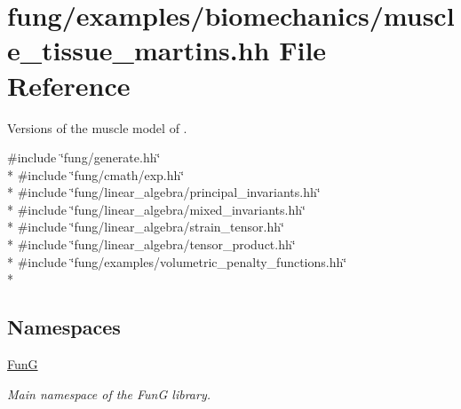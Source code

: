 \hypertarget{muscle__tissue__martins_8hh}{}\section{fung/examples/biomechanics/muscle\+\_\+tissue\+\_\+martins.hh File Reference}
\label{muscle__tissue__martins_8hh}


Versions of the muscle model of \cite{Martins1998}.  


{\ttfamily \#include \char`\"{}fung/generate.\+hh\char`\"{}}\\*
{\ttfamily \#include \char`\"{}fung/cmath/exp.\+hh\char`\"{}}\\*
{\ttfamily \#include \char`\"{}fung/linear\+\_\+algebra/principal\+\_\+invariants.\+hh\char`\"{}}\\*
{\ttfamily \#include \char`\"{}fung/linear\+\_\+algebra/mixed\+\_\+invariants.\+hh\char`\"{}}\\*
{\ttfamily \#include \char`\"{}fung/linear\+\_\+algebra/strain\+\_\+tensor.\+hh\char`\"{}}\\*
{\ttfamily \#include \char`\"{}fung/linear\+\_\+algebra/tensor\+\_\+product.\+hh\char`\"{}}\\*
{\ttfamily \#include \char`\"{}fung/examples/volumetric\+\_\+penalty\+\_\+functions.\+hh\char`\"{}}\\*
\subsection*{Namespaces}
\begin{DoxyCompactItemize}
\item 
 \hyperlink{namespaceFunG}{Fun\+G}
\begin{DoxyCompactList}\small\item\em Main namespace of the Fun\+G library. \end{DoxyCompactList}\end{DoxyCompactItemize}

